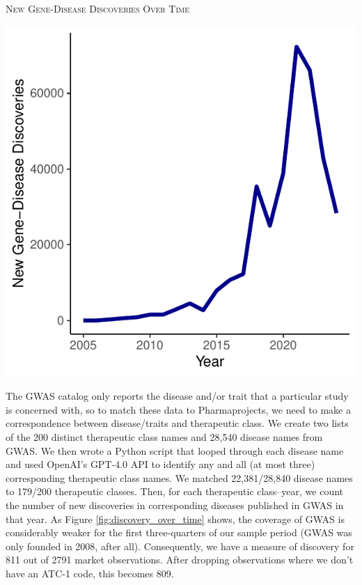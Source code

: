 \begin{lightfigure}[h!]
\caption{\textsc{New Gene-Disease Discoveries Over Time}}
\label{fig:discovery_over_time}
    \centering
        \includegraphics[width=.4\linewidth]{figures/discovery_over_time.pdf}
\end{lightfigure}

The GWAS catalog only reports the disease and/or trait that a particular study is concerned with, so to match these data to Pharmaprojects, we need to make a correspondence between disease/traits and therapeutic class. We create two lists of the 200 distinct therapeutic class names and 28,540 disease names from GWAS. We then wrote a Python script that looped through each disease name and used OpenAI's GPT-4.0 API to identify any and all (at most three) corresponding therapeutic class names. We matched 22,381/28,840 disease names to 179/200 therapeutic classes. Then, for each therapeutic class--year, we count the number of new discoveries in corresponding diseases published in GWAS in that year. As Figure \ref{fig:discovery_over_time} shows, the coverage of GWAS is considerably weaker for the first three-quarters of our sample period (GWAS was only founded in 2008, after all). Consequently, we have a measure of discovery for 811 out of 2791 market observations. After dropping observations where we don't have an ATC-1 code, this becomes 809. 
